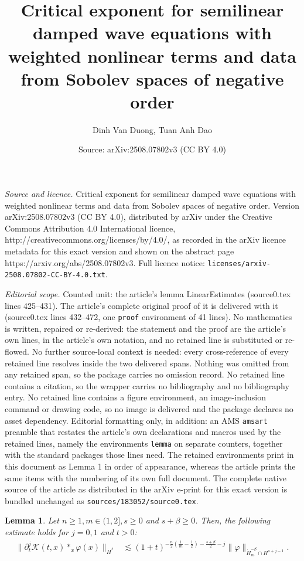 \documentclass[10pt,a4paper]{amsart}
\title{Critical exponent for semilinear damped wave equations with weighted nonlinear terms and data from Sobolev spaces of negative order}
\author{Dinh Van Duong, Tuan Anh Dao}
\date{Source: arXiv:2508.07802v3 (CC BY 4.0)}
\newtheorem{lemma}{Lemma}
\begin{document}
\maketitle

\noindent\emph{Source and licence.} Critical exponent for semilinear damped wave equations with weighted nonlinear terms and data from Sobolev spaces of negative order. Version arXiv:2508.07802v3 (CC BY 4.0), distributed by arXiv under the Creative Commons Attribution 4.0 International licence, http://creativecommons.org/licenses/by/4.0/, as recorded in the arXiv licence metadata for this exact version and shown on the abstract page https://arxiv.org/abs/2508.07802v3. Full licence notice: \texttt{licenses/arxiv-2508.07802-CC-BY-4.0.txt}.\par\smallskip

\noindent\textit{Editorial scope.} Counted unit: the article's lemma LinearEstimates (source0.tex lines 425--431). The article's complete original proof of it is delivered with it (source0.tex lines 432--472, one \texttt{proof} environment of 41 lines). No mathematics is written, repaired or re-derived: the statement and the proof are the article's own lines, in the article's own notation, and no retained line is substituted or re-flowed.  No further source-local context is needed: every cross-reference of every retained line resolves inside the two delivered spans.  Nothing was omitted from any retained span, so the package carries no omission record.  No retained line contains a citation, so the wrapper carries no bibliography and no bibliography entry.  No retained line contains a figure environment, an image-inclusion command or drawing code, so no image is delivered and the package declares no asset dependency.  Editorial formatting only, in addition: an AMS \texttt{amsart} preamble that restates the article's own declarations and macros used by the retained lines, namely the environments \texttt{lemma} on separate counters, together with the standard packages those lines need.  The retained environments print in this document as Lemma 1 in order of appearance, whereas the article prints the same items with the numbering of its own full document.  The complete native source of the article as distributed in the arXiv e-print for this exact version is bundled unchanged as \texttt{sources/183052/source0.tex}.
\begin{lemma}\label{LinearEstimates}
    Let $n \geq 1, m \in (1,2], s \geq 0$ and $s+\beta \geq 0$.  Then, the following estimate holds for $j = 0,1$ and $t > 0$:
    \begin{align*}
        \| \partial_t^j \mathcal{K}(t,x)\ast_x \varphi(x)\|_{\dot{H}^s} 
        &\lesssim (1+t)^{-\frac{n}{2}(\frac{1}{m}-\frac{1}{2})-\frac{s+\beta}{2}-j} \|\varphi\|_{\dot{H}_m^{-\beta} \cap H^{s+j-1}}.
        \end{align*}
\end{lemma}
\end{document}
